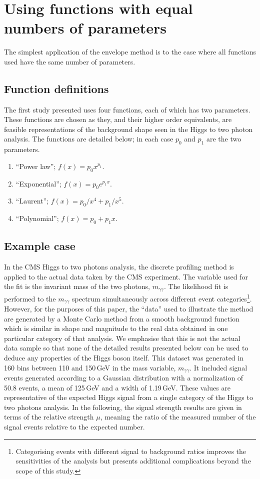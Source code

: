 \section{Using functions with equal numbers of parameters} %
\label{sec:functions}

The simplest application of the envelope method is to the case where all
functions used have the same number of parameters.

\subsection{Function definitions}
\label{sec:functions:function}

The first study presented uses four functions, each of which has two parameters.
These functions are chosen as they, and their higher order equivalents,
are feasible representations of the background shape seen in the Higgs to two photon
analysis. The functions are detailed below; in each case $p_0$ and $p_1$ are
the two parameters.
\begin{enumerate}
\item
``Power law''; $f(x) = p_0 x^{p_1}$.
\item
``Exponential''; $f(x) = p_0 e^{p_1x}$.
\item
``Laurent''; $f(x) = p_0/x^4 + p_1/x^5$.
\item
``Polynomial''; $f(x) = p_0 + p_1 x$.
\end{enumerate}

\subsection{Example case}
\label{sec:functions:example}

In the CMS Higgs to two photons analysis, the discrete profiling method is applied to
the actual data taken by the CMS experiment. The variable used for the fit is the invariant mass of the two photons, $m_{\gamma\gamma}$.
The likelihood fit is performed to the $m_{\gamma\gamma}$ spectrum simultaneously
across different event categories\footnote{Categorising events with different signal to background ratios improves the sensitivities 
of the analysis but presents additional complications beyond the scope of this study.}.
However, for the purposes of this
paper, the ``data'' used to illustrate the method are generated by a Monte Carlo
method from a smooth background
function which is similar in shape and magnitude to the
real data obtained in one particular category of that analysis. We emphasise that this is not the
actual data sample so that none of the detailed results presented below can be used to deduce any
properties of the Higgs boson itself.
This dataset was generated in 160 bins between 110 and 150\,GeV in
the mass variable, $m_{\gamma\gamma}$.
It included signal events
generated according to a Gaussian distribution with a normalization of 50.8 events, a mean of 125\,GeV and a
width of 1.19\,GeV. These values are representative of the expected Higgs signal from a single category of the 
Higgs to two photons analysis.
In the following, the signal strength results are given in
terms of the relative strength $\mu$,
meaning the ratio of the measured number of the signal events relative
to the expected number.

